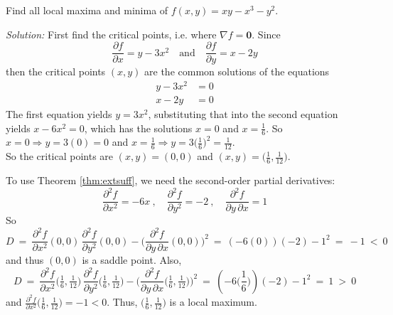 \begin{exmp}
 Find all local maxima and minima of $f(x,y) = xy - x^3 - y^2$.\vspace{1mm}
 \par\noindent\emph{Solution:} First find the critical points, i.e. where $\nabla f = \textbf{0}$. Since
 \begin{displaymath}
  \frac{\partial f}{\partial x} = y - 3x^2 \quad \text{and} \quad \frac{\partial f}{\partial y} = x - 2y
 \end{displaymath}
\newpage
\noindent then the critical points $(x,y)$ are the common solutions of the equations
 \begin{align*}
  y - 3x^2 &= 0\\
  x - 2y &= 0
 \end{align*}
 The first equation yields $y = 3x^2$, substituting that into the second equation yields $x - 6x^2 = 0$, which
 has the solutions $x = 0$ and $x = \frac{1}{6}$. So $x = 0 \Rightarrow y = 3(0) = 0$ and $x = \frac{1}{6} \Rightarrow
 y = 3\bigl( \frac{1}{6} \bigr)^2 = \frac{1}{12}$.\\
 So the critical points are $(x,y) = (0,0)$ and $(x,y) = \bigl( \frac{1}{6}, \frac{1}{12} \bigr)$.
 
 To use Theorem \ref{thm:extsuff}, we need the second-order partial derivatives:
 \begin{displaymath}
  \frac{\partial^2 f}{\partial x^2} = -6x ~,\quad \frac{\partial^2 f}{\partial y^2} = -2 ~,\quad
  \dfrac{\partial^2 f}{\partial y \, \partial x} = 1
 \end{displaymath}
 So
 \begin{displaymath}
  D ~=~ \dfrac{\partial^2 f}{\partial x^2}(0,0) \, \dfrac{\partial^2 f}{\partial y^2}(0,0) -
 \biggl( \dfrac{\partial^2 f}{\partial y \, \partial x}(0,0) \biggr)^2 ~=~ (-6(0))(-2) - 1^2 ~=~ -1 ~<~ 0
 \end{displaymath}
 and thus $(0,0)$ is a saddle point.
 Also,
 \begin{displaymath}
  D ~=~ \dfrac{\partial^2 f}{\partial x^2}\bigl( \tfrac{1}{6}, \tfrac{1}{12} \bigr) \, 
  \dfrac{\partial^2 f}{\partial y^2}\bigl( \tfrac{1}{6}, \tfrac{1}{12} \bigr) -
 \biggl( \dfrac{\partial^2 f}{\partial y \, \partial x}\bigl( \tfrac{1}{6}, \tfrac{1}{12} \bigr) \biggr)^2 ~=~
 (-6\bigl(\frac{1}{6}\bigr))(-2) - 1^2 ~=~ 1 ~>~ 0
 \end{displaymath}
 and $\frac{\partial^2 f}{\partial x^2}\bigl( \frac{1}{6}, \frac{1}{12} \bigr) = -1 < 0$.
 Thus, $\bigl( \frac{1}{6}, \frac{1}{12} \bigr)$ is a local maximum.
 \end{exmp}
